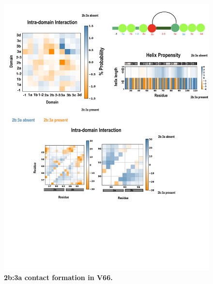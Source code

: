 \documentclass[10pt,letterpaper]{article}
\begin{document}
\begin{figure}[!ht]
\includegraphics[scale=0.5,width=12cm,trim={0 0cm 0 0cm},clip]{../figures/coupling_2.pdf}
\caption{{\bf 2b:3a contact formation in V66.}
 }
\label{fig6}
\end{figure}
\end{document}
